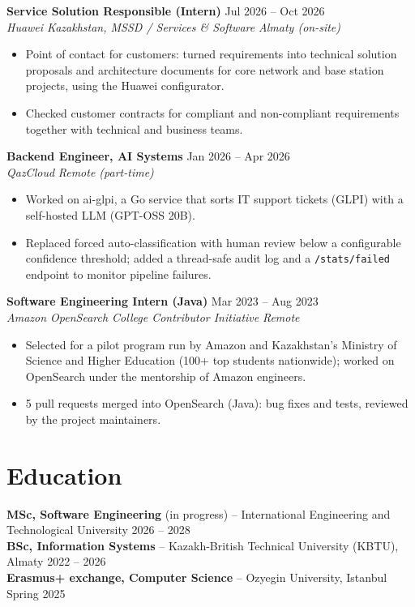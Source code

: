 \documentclass[10pt,a4paper]{article}
\newcommand{\resumeEntry}[4]{%
  \textbf{#1} \hfill #2\\
  \textit{#3} \hfill \textit{#4}\vspace{-2pt}
}
\begin{document}
\resumeEntry{Service Solution Responsible (Intern)}{Jul 2026 -- Oct 2026}{Huawei Kazakhstan, MSSD / Services \& Software}{Almaty (on-site)}
\begin{itemize}
  \item Point of contact for customers: turned requirements into technical solution proposals and architecture documents for core network and base station projects, using the Huawei configurator.
  \item Checked customer contracts for compliant and non-compliant requirements together with technical and business teams.
\end{itemize}

\resumeEntry{Backend Engineer, AI Systems}{Jan 2026 -- Apr 2026}{QazCloud}{Remote (part-time)}
\begin{itemize}
  \item Worked on ai-glpi, a Go service that sorts IT support tickets (GLPI) with a self-hosted LLM (GPT-OSS 20B).
  \item Replaced forced auto-classification with human review below a configurable confidence threshold; added a thread-safe audit log and a \texttt{/stats/failed} endpoint to monitor pipeline failures.
\end{itemize}

\resumeEntry{Software Engineering Intern (Java)}{Mar 2023 -- Aug 2023}{Amazon OpenSearch College Contributor Initiative}{Remote}
\begin{itemize}
  \item Selected for a pilot program run by Amazon and Kazakhstan's Ministry of Science and Higher Education (100+ top students nationwide); worked on OpenSearch under the mentorship of Amazon engineers.
  \item 5 pull requests merged into OpenSearch (Java): bug fixes and tests, reviewed by the project maintainers.
\end{itemize}

\section{Education}
\textbf{MSc, Software Engineering} (in progress) -- International Engineering and Technological University \hfill 2026 -- 2028\\
\textbf{BSc, Information Systems} -- Kazakh-British Technical University (KBTU), Almaty \hfill 2022 -- 2026\\
\textbf{Erasmus+ exchange, Computer Science} -- Ozyegin University, Istanbul \hfill Spring 2025
\end{document}
